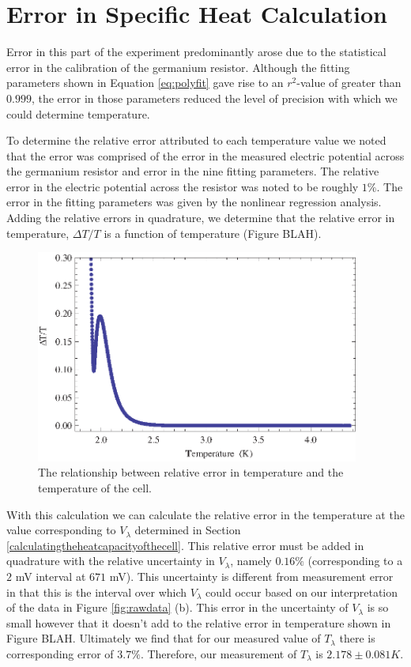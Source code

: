 
\section{Error in Specific Heat Calculation}\label{errorinspecificheatcalculation}

Error in this part of the experiment predominantly arose due to the statistical error in the calibration of the germanium resistor.  Although the fitting parameters shown in Equation \ref{eq:polyfit} gave rise to an $r^{2}$-value of greater than $0.999$, the error in those parameters reduced the level of precision with which we could determine temperature.  

To determine the relative error attributed to each temperature value we noted that the error was comprised of the error in the measured electric potential across the germanium resistor and error in the nine fitting parameters.  The relative error in the electric potential across the resistor was noted to be roughly $1\%$.  The error in the fitting parameters was given by the nonlinear regression analysis.  Adding the relative errors in quadrature, we determine that the relative error in temperature, $\Delta T/T$ is a function of temperature (Figure BLAH).  

\begin{figure}[htbp]
\begin{center}
\includegraphics[height=70mm]{./figures/temperror.eps}
\caption{\small{The relationship between relative error in temperature and the temperature of the cell.}}
\label{fig:temperror}
\end{center}
\end{figure}

With this calculation we can calculate the relative error in the temperature at the value corresponding to $V_{\lambda}$ determined in Section \ref{calculatingtheheatcapacityofthecell}.  This relative error must be added in quadrature with the relative uncertainty in $V_{\lambda}$, namely $0.16\%$ (corresponding to a $2$ mV interval at $671$ mV).  This uncertainty is different from measurement error in that this is the interval over which $V_{\lambda}$ could occur based on our interpretation of the data in Figure \ref{fig:rawdata} (b).  This error in the uncertainty of $V_{\lambda}$ is so small however that it doesn't add to the relative error in temperature shown in Figure BLAH.  Ultimately we find that for our measured value of $T_{\lambda}$ there is corresponding error of $3.7\%$.  Therefore, our measurement of $T_{\lambda}$ is $2.178\pm0.081 K$.

